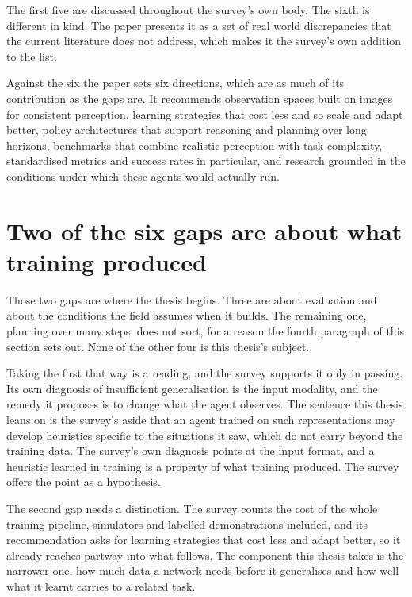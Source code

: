 The first five are discussed throughout the survey's own body. The sixth is
different in kind. The paper presents it as a set of real world discrepancies
that the current literature does not address, which makes it the survey's own
addition to the list.

Against the six the paper sets six directions, which are as much of its
contribution as the gaps are. It recommends observation spaces built on images
for consistent perception, learning strategies that cost less and so scale and
adapt better, policy architectures that support reasoning and planning over
long horizons, benchmarks that combine realistic perception with task
complexity, standardised metrics and success rates in particular, and research
grounded in the conditions under which these agents would actually run.

\section{Two of the six gaps are about what training produced}
\label{sec:acu_takes}

Those two gaps are where the thesis begins. Three are about evaluation and about the conditions the field assumes when it
builds. The remaining one, planning over many steps, does not sort, for a
reason the fourth paragraph of this section sets out. None of the other four
is this thesis's subject.

Taking the first that way is a reading, and the survey supports it only in
passing. Its own diagnosis of insufficient generalisation is the input
modality, and the remedy it proposes is to change what the agent observes. The
sentence this thesis leans on is the survey's aside that an agent trained on
such representations may develop heuristics specific to the situations it saw,
which do not carry beyond the training data. The survey's own diagnosis
points at the input format, and a heuristic learned in training is a property
of what training produced. The survey offers the point as a hypothesis.

The second gap needs a distinction. The survey counts the cost of the whole
training pipeline, simulators and labelled demonstrations included, and its
recommendation asks for learning strategies that cost less and adapt better,
so it already reaches partway into what follows. The component this thesis
takes is the narrower one, how much data a network needs before it generalises
and how well what it learnt carries to a related task.

